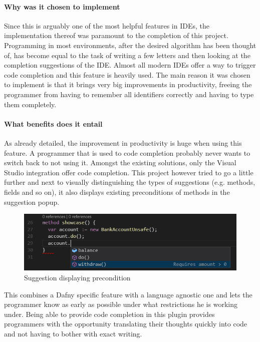 \paragraph{Why was it chosen to implement}
Since this is arguably one of the most helpful features in IDEs, the implementation thereof was paramount to the completion of this project. Programming in most environments, after the desired algorithm has been thought of, has become equal to the task of writing a few letters and then looking at the completion suggestions of the IDE.  \newline
Almost all modern IDEs offer a way to trigger code completion and this feature is heavily used. The main reason it was chosen to implement is that it brings very big improvements in productivity, freeing the programmer from having to remember all identifiers correctly and having to type them completely.

\paragraph{What benefits does it entail}
As already detailed, the improvement in productivity is huge when using this feature. A programmer that is used to code completion probably never wants to switch back to not using it. Amongst the existing solutions, only the Visual Studio integration offer code completion. This project however tried to go a little further and next to visually distinguishing the types of suggestions (e.g. methods, fields and so on), it also displays existing preconditions of methods in the suggestion popup. \newline

\begin{figure}[H]
	\centering
	\includegraphics[width=1\textwidth]{img/codeCompletionMethod}
	\caption{Suggestion displaying precondition}
	\label{fig:agcodecompletionmethod}
\end{figure}

This combines a Dafny specific feature with a language agnostic one and lets the programmer know as early as possible under what restrictions he is working under. Being able to provide code completion in this plugin provides programmers with the opportunity translating their thoughts quickly into code and not having to bother with exact writing. \newline

